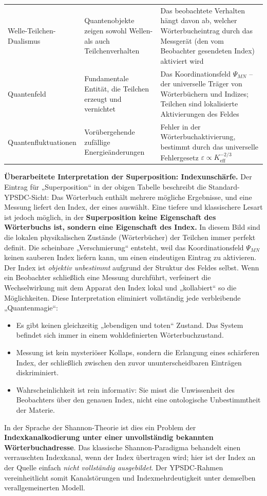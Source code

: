 \documentclass[12pt,a4paper]{article}
\theoremstyle{remark}
\begin{document}
\begin{longtable}{p{3.8cm} p{5cm} p{7cm}}
		\addlinespace
		Welle-Teilchen-Dualismus &
		Quantenobjekte zeigen sowohl Wellen- als auch Teilchenverhalten &
		Das beobachtete Verhalten hängt davon ab, welcher Wörterbucheintrag durch das Messgerät (den vom Beobachter gesendeten Index) aktiviert wird \\
		\addlinespace
		Quantenfeld &
		Fundamentale Entität, die Teilchen erzeugt und vernichtet &
		Das Koordinationsfeld \(\Psi_{MN}\) – der universelle Träger von Wörterbüchern und Indizes; Teilchen sind lokalisierte Aktivierungen des Feldes \\
		\addlinespace
		Quantenfluktuationen &
		Vorübergehende zufällige Energieänderungen &
		Fehler in der Wörterbuchaktivierung, bestimmt durch das universelle Fehlergesetz \(\varepsilon \propto K_{\mathrm{eff}}^{-2/3}\) \\
	\end{longtable}
	
	\noindent
	\textbf{Überarbeitete Interpretation der Superposition: Indexunschärfe.}
	Der Eintrag für „Superposition“ in der obigen Tabelle beschreibt die Standard-YPSDC-Sicht: Das Wörterbuch enthält mehrere mögliche Ergebnisse, und eine Messung liefert den Index, der eines auswählt. Eine tiefere und klassischere Lesart ist jedoch möglich, in der \textbf{Superposition keine Eigenschaft des Wörterbuchs ist, sondern eine Eigenschaft des Index.}
	In diesem Bild sind die lokalen physikalischen Zustände (Wörterbücher) der Teilchen immer perfekt definit. Die scheinbare „Verschmierung“ entsteht, weil das Koordinationsfeld \(\Psi_{MN}\) keinen sauberen Index liefern kann, um einen eindeutigen Eintrag zu aktivieren. Der Index ist \emph{objektiv unbestimmt} aufgrund der Struktur des Feldes selbst. Wenn ein Beobachter schließlich eine Messung durchführt, verfeinert die Wechselwirkung mit dem Apparat den Index lokal und „kollabiert“ so die Möglichkeiten.
	Diese Interpretation eliminiert vollständig jede verbleibende „Quantenmagie“:
	\begin{itemize}[leftmargin=*]
		\item Es gibt keinen gleichzeitig „lebendigen und toten“ Zustand. Das System befindet sich immer in einem wohldefinierten Wörterbuchzustand.
		\item Messung ist kein mysteriöser Kollaps, sondern die Erlangung eines schärferen Index, der schließlich zwischen den zuvor ununterscheidbaren Einträgen diskriminiert.
		\item Wahrscheinlichkeit ist rein informativ: Sie misst die Unwissenheit des Beobachters über den genauen Index, nicht eine ontologische Unbestimmtheit der Materie.
	\end{itemize}
	In der Sprache der Shannon-Theorie ist dies ein Problem der \textbf{Indexkanalkodierung unter einer unvollständig bekannten Wörterbuchadresse}. Das klassische Shannon-Paradigma behandelt einen verrauschten Indexkanal, wenn der Index übertragen wird; hier ist der Index an der Quelle einfach \emph{nicht vollständig ausgebildet}. Der YPSDC-Rahmen vereinheitlicht somit Kanalstörungen und Indexmehrdeutigkeit unter demselben verallgemeinerten Modell.
	
\end{document}
